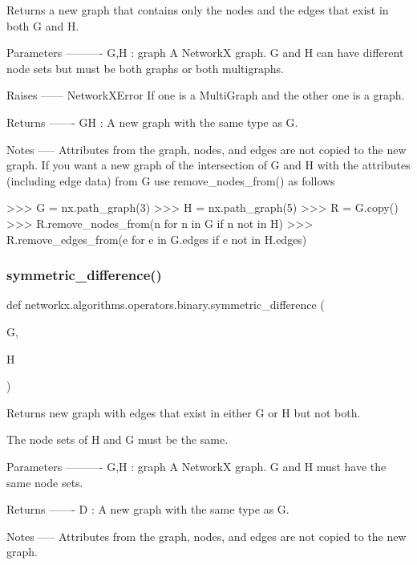 \begin{DoxyVerb}Returns a new graph that contains only the nodes and the edges that exist in
both G and H.

Parameters
----------
G,H : graph
   A NetworkX graph. G and H can have different node sets but must be both graphs or both multigraphs.

Raises
------
NetworkXError
    If one is a MultiGraph and the other one is a graph.

Returns
-------
GH : A new graph with the same type as G.

Notes
-----
Attributes from the graph, nodes, and edges are not copied to the new
graph.  If you want a new graph of the intersection of G and H
with the attributes (including edge data) from G use remove_nodes_from()
as follows

>>> G = nx.path_graph(3)
>>> H = nx.path_graph(5)
>>> R = G.copy()
>>> R.remove_nodes_from(n for n in G if n not in H)
>>> R.remove_edges_from(e for e in G.edges if e not in H.edges)
\end{DoxyVerb}
 \mbox{\label{namespacenetworkx_1_1algorithms_1_1operators_1_1binary_a5e3003e6b8541bbe1ee2b7ef1339a490}} 
\subsubsection{\texorpdfstring{symmetric\+\_\+difference()}{symmetric\_difference()}}
{\footnotesize\ttfamily def networkx.\+algorithms.\+operators.\+binary.\+symmetric\+\_\+difference (\begin{DoxyParamCaption}\item[{}]{G,  }\item[{}]{H }\end{DoxyParamCaption})}

\begin{DoxyVerb}Returns new graph with edges that exist in either G or H but not both.

The node sets of H and G must be the same.

Parameters
----------
G,H : graph
   A NetworkX graph.  G and H must have the same node sets.

Returns
-------
D : A new graph with the same type as G.

Notes
-----
Attributes from the graph, nodes, and edges are not copied to the new
graph.
\end{DoxyVerb}
 \mbox{\label{namespacenetworkx_1_1algorithms_1_1operators_1_1binary_a50ec19daf9362376b5b30a6cecd15332}} 
